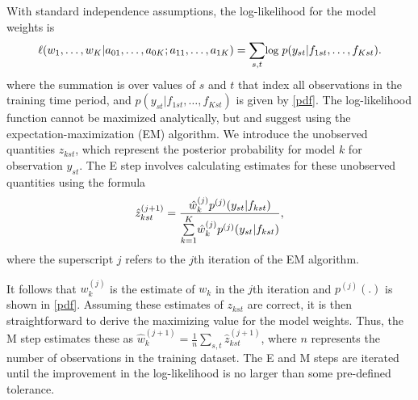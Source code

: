 With standard independence assumptions, the log-likelihood for the
model weights is
\begin{equation}
\small
  \ell (w_1, \ldots, w_K | a_{01},  \ldots, a_{0K}; a_{11},
  \ldots, a_{1K})= \underset{s,t}{\sum}\mbox{log }p(y_{st} |
  f_{1st}, \ldots, f_{Kst}).
\end{equation}
\noindent where the summation is over values of $s$ and $t$ that index
all observations in the training time period, and $p(y_{st}|f_{1st},
\ldots, f_{Kst}) $ is given by \eqref{pdf}. The log-likelihood
function cannot be maximized analytically, but \citet{Raftery:2005}
and \citet{Sloughter:2007} suggest using the expectation-maximization
(EM) algorithm.  We introduce the unobserved quantities $z_{kst}$,
which represent the posterior probability for model $k$ for
observation $y_{st}$.  The E step involves calculating estimates for
these unobserved quantities using the formula
\begin{equation}
\small
\hat{z}^{(j+1)}_{kst} = \frac{\hat{w}^{(j)}_k
p^{(j)}(y_{st}|f_{kst})}{\overset{K}{\underset{k=1}{\sum}}\hat{w}^{(j)}_kp^{(j)}(y_{st}|f_{kst})},
\end{equation}
\noindent where the superscript $j$ refers to the $j$th iteration of
the EM algorithm.

It follows that $w_k^{(j)}$ is the estimate of $w_k$ in the $j$th
iteration and $p^{(j)}(.)$ is shown in \eqref{pdf}.  Assuming these
estimates of $z_{kst}$ are correct, it is then straightforward to
derive the maximizing value for the model weights. Thus, the M step
estimates these as
$\hat{w}^{(j+1)}_k=\frac{1}{n}\underset{s,t}{\sum}\hat{z}^{(j+1)}_{kst}$,
where $n$ represents the number of observations in the training
dataset.
The E and M steps are iterated until the improvement in the
log-likelihood is no larger than some pre-defined
tolerance.



